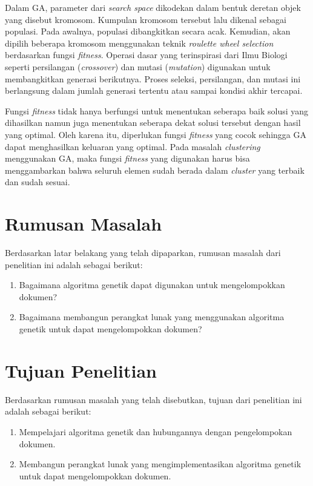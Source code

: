 Dalam GA, parameter dari \textit{search space} dikodekan dalam bentuk deretan objek yang disebut kromosom. Kumpulan kromosom tersebut lalu dikenal sebagai populasi. Pada awalnya, populasi dibangkitkan secara acak. Kemudian, akan dipilih beberapa kromosom menggunakan teknik \textit{roulette wheel selection} berdasarkan fungsi \textit{fitness}. Operasi dasar yang terinspirasi dari Ilmu Biologi seperti persilangan (\textit{crossover}) dan mutasi (\textit{mutation}) digunakan untuk membangkitkan generasi berikutnya. Proses seleksi, persilangan, dan mutasi ini berlangsung dalam jumlah generasi tertentu atau sampai kondisi akhir tercapai.

Fungsi \textit{fitness} tidak hanya berfungsi untuk menentukan seberapa baik solusi yang dihasilkan namun juga menentukan seberapa dekat solusi tersebut dengan hasil yang optimal.\cite{sivanandam2007introduction} Oleh karena itu, diperlukan fungsi \textit{fitness} yang cocok sehingga GA dapat menghasilkan keluaran yang optimal. Pada masalah \textit{clustering} menggunakan GA, maka fungsi \textit{fitness} yang digunakan harus bisa menggambarkan bahwa seluruh elemen sudah berada dalam \textit{cluster} yang terbaik dan sudah sesuai.

\section{Rumusan Masalah}
\label{sec:rumusan}
Berdasarkan latar belakang yang telah dipaparkan, rumusan masalah dari penelitian ini adalah sebagai berikut:

\begin{enumerate}
 \item Bagaimana algoritma genetik dapat digunakan untuk mengelompokkan dokumen?
 \item Bagaimana membangun perangkat lunak yang menggunakan algoritma genetik untuk dapat mengelompokkan
dokumen?
\end{enumerate}

\section{Tujuan Penelitian}
\label{sec:tujuan}
Berdasarkan rumusan masalah yang telah disebutkan, tujuan dari penelitian ini adalah sebagai berikut:

\begin{enumerate}
	\item Mempelajari algoritma genetik dan hubungannya dengan pengelompokan dokumen.
	\item Membangun perangkat lunak yang mengimplementasikan algoritma genetik untuk dapat mengelompokkan
dokumen.
\end{enumerate}

